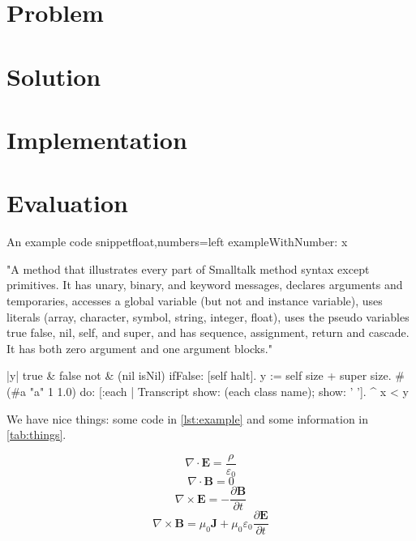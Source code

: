 \section{Problem}
\label{sec:problem}


\section{Solution}
\label{sec:solution}


\section{Implementation}
\label{sec:implementation}


\section{Evaluation}
\label{sec:evaluation}

\lstset{language=Smalltalk}
\begin{code}{An example code snippet}{float,numbers=left}
exampleWithNumber: x

"A method that illustrates every part of Smalltalk method syntax
except primitives. It has unary, binary, and keyword messages,
declares arguments and temporaries, accesses a global variable
(but not and instance variable), uses literals (array, character,
symbol, string, integer, float), uses the pseudo variables
true false, nil, self, and super, and has sequence, assignment,
return and cascade. It has both zero argument and one argument blocks."

    |y|
    true & false not & (nil isNil) ifFalse: [self halt].
    y := self size + super size.
    #(#a "a" 1 1.0)
        do: [:each | Transcript show: (each class name);
                                 show: ' '].
     ^ x < y
\end{code}


We have nice things: some code in \autoref{lst:example} and some information
in \autoref{tab:things}.

\[\nabla \cdot \mathbf{E} = \frac{\rho}{\varepsilon_0}\]
\[\nabla \cdot \mathbf{B} = 0\]
\[\nabla \times \mathbf{E} = -\frac {\partial \mathbf{B}}{\partial t}\]
\[\nabla \times \mathbf{B} = \mu_0 \mathbf{J} + \mu_0\varepsilon_0  \frac{\partial \mathbf{E}}{\partial t}\]


